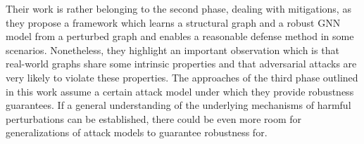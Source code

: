 \documentclass[a4paper,preprint]{sig-alternate}
\begin{document}
Their work is rather belonging to the second phase, dealing with mitigations, as they propose a framework which learns a structural graph and 
a robust GNN model from a perturbed graph and enables a reasonable defense method in some scenarios.
Nonetheless, they highlight an important observation which is that real-world graphs share some intrinsic properties and that adversarial 
attacks are very likely to violate these properties.
The approaches of the third phase outlined in this work assume a certain attack model under which they provide robustness guarantees.
If a general understanding of the underlying mechanisms of harmful perturbations can be established, there could be even more room
for generalizations of attack models to guarantee robustness for.

\vfill
\pagebreak



\end{document}

